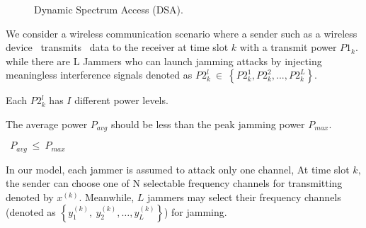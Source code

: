 \documentclass[letterpaper%
, twoside%
, 12pt%
,thesepararticles%
, english%
,creativecommons,hyperref, withAlgo2e%
]{thETS}
\begin{document}
\begin{figure}
{
}
\caption{Dynamic Spectrum Access (DSA).} \label{fig:DSA}
\end{figure}
 
 We consider a wireless communication scenario where a sender such as a wireless device \ transmits \ data to the receiver at time slot $\displaystyle k$ with a transmit power $\displaystyle P1_{k}$. while there are L Jammers who can launch jamming attacks by injecting meaningless interference signals denoted as $\displaystyle P2_{k}^{l} \ \in \ \left\{P2_{k}^{1} ,P2_{k}^{2} ,...,P2_{k}^{L}\right\} .$

Each $\displaystyle P2_{k}^{l}$ has $\displaystyle I$ different power levels. 



 The average power $\displaystyle P_{avg}$ should be less than the peak jamming power $\displaystyle P_{max}$. 



$\displaystyle \ \ P_{avg} \ \leq \ P_{max}$ 



In our model, each jammer is assumed to attack only one channel, At time slot $\displaystyle k,$the sender can choose one of N selectable frequency channels for transmitting denoted by $\displaystyle x^{( k)} .$ Meanwhile, $\displaystyle L$ jammers may select their frequency channels (denoted as $\displaystyle \left\{y_{1}^{( k)} ,\ y_{2}^{( k)} ,\dotsc ,y_{L}^{( k)}\right\}$) for jamming. 
  
\end{document}
